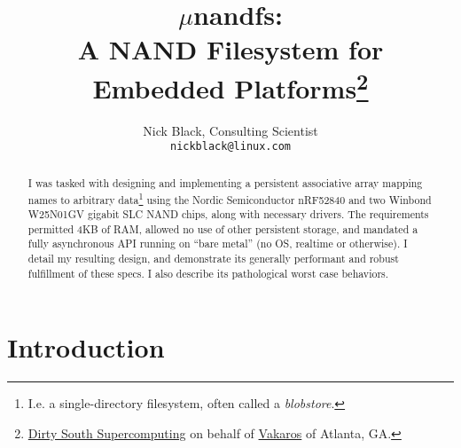 \documentclass[letterpaper,10pt]{article}
\title{$\mu$nandfs:\\
A NAND Filesystem for Embedded Platforms\thanks{
 \href{https://www.dsscaw.com/}{Dirty South Supercomputing} on behalf
 of \href{https://www.vakaros.com/}{Vakaros} of Atlanta, GA.
}\\
}
\author{Nick Black, Consulting Scientist\\
\texttt{nickblack@linux.com}
}
\begin{document}
\maketitle
\thispagestyle{fancy}
\date{}
\begin{abstract}
\setlength{\parindent}{0pt}
I was tasked with designing and implementing a persistent associative array
mapping names to arbitrary data\footnote{I.e. a single-directory filesystem, often called a \textit{blobstore}.}
using the Nordic Semiconductor nRF52840 and two Winbond W25N01GV gigabit SLC
NAND chips, along with necessary drivers. The requirements permitted 4KB of RAM,
allowed no use of other persistent storage, and mandated a fully asynchronous
API running on ``bare metal'' (no OS, realtime or otherwise). I detail my
resulting design, and demonstrate its generally performant and robust
fulfillment of these specs. I also describe its pathological worst case
behaviors.
\end{abstract}
\section{Introduction}
\printbibliography
\end{document}
